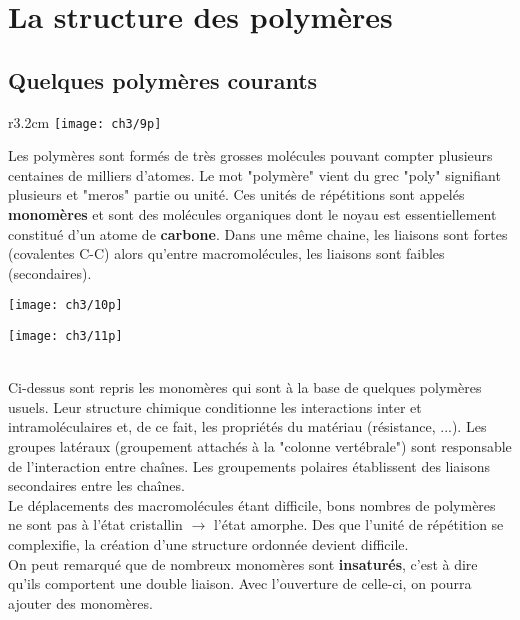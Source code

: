 \section{La structure des polymères}
	\subsection{Quelques polymères courants}
		\begin{wrapfigure}[2]{r}{3.2cm}
		\vspace{-5mm}
		\texttt{[image: ch3/9p]}
		\end{wrapfigure}	
		Les polymères sont formés de très grosses molécules pouvant compter plusieurs centaines de milliers d'atomes. Le mot "polymère" vient du grec "poly" signifiant plusieurs et "meros" partie ou unité. Ces unités de répétitions sont appelés \textbf{monomères} et sont des molécules organiques dont le noyau est essentiellement constitué d'un atome de \textbf{carbone}. Dans une même chaine, les liaisons sont fortes (covalentes C-C) alors qu'entre macromolécules, les liaisons sont faibles (secondaires).\\
		
		\begin{minipage}{0.5 \textwidth}
			\begin{flushleft}
				\texttt{[image: ch3/10p]}
			\end{flushleft}
		\end{minipage}
		\begin{minipage}{0.5 \textwidth}
			\begin{flushright}
				\texttt{[image: ch3/11p]}
			\end{flushright}
		\end{minipage}
		\ \\
		Ci-dessus sont repris les monomères qui sont à la base de quelques polymères usuels. Leur structure chimique conditionne les interactions inter et intramoléculaires et, de ce fait, les propriétés du matériau (résistance, ...). Les groupes latéraux (groupement attachés à la "colonne vertébrale") sont responsable de l'interaction entre chaînes. Les groupements polaires établissent des liaisons secondaires entre les chaînes. \\
		Le déplacements des macromolécules étant difficile, bons nombres de polymères ne sont pas à l'état cristallin $\rightarrow$ l'état amorphe. Des que l'unité de répétition se complexifie, la création d'une structure ordonnée devient difficile. \\
		On peut remarqué que de nombreux monomères sont \textbf{insaturés}, c'est à dire qu'ils comportent une double liaison. Avec l'ouverture de celle-ci, on pourra ajouter des monomères. 
		
